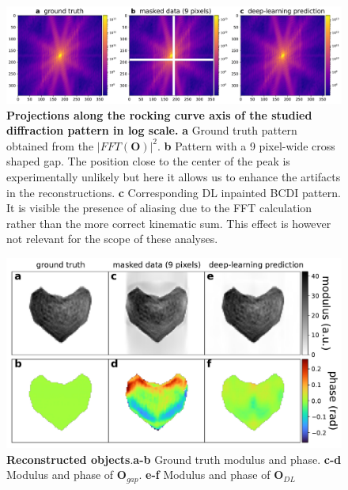 \begin{figure}[ht]
    \centering
    \includegraphics[width=\textwidth]{figures/Inpainting/Carnis_Diffractions_comparison_9px_version2.pdf}
    \caption{\textbf{Projections along the rocking curve axis of the studied diffraction pattern in log scale.} \textbf{a} Ground truth
    pattern obtained from the $|FFT(\textbf{O})|^2$. \textbf{b} Pattern with a 9 pixel-wide cross shaped gap. The position close to the center of 
    the peak is experimentally unlikely but here it allows us to enhance the artifacts in the reconstructions. \textbf{c} 
    Corresponding DL inpainted BCDI pattern. It is visible the presence of aliasing due to the FFT calculation rather than 
    the more correct kinematic sum. This effect is however not relevant for the scope of these analyses.}
    \label{fig:Carnis_int}
\end{figure}

\begin{figure}[ht]
    \centering
    \includegraphics[width=\textwidth]{figures/Inpainting/Real_space_comparison_axis0-1.pdf}
    \caption{\textbf{Reconstructed objects}.\textbf{a-b} Ground truth modulus and phase. \textbf{c-d} Modulus and phase of  
    $\textbf{O}_{gap}$. \textbf{e-f} Modulus and phase of $\textbf{O}_{DL}$}
    \label{fig:Carnis_obj}
\end{figure} 

